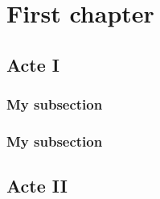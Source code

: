 \documentclass{wfrp}
\begin{document}
\chapter{First chapter }

\section{Acte I}

\begin{multicols}{2}
  \lipsum[1-3]
  \subsection{My subsection}
  \lipsum[1-2]
  \subsection{My subsection}
  \lipsum[1-21]
\end{multicols}

\section{Acte II}
\begin{multicols}{2}
  \lipsum[1-20]
\end{multicols}
\end{document}
